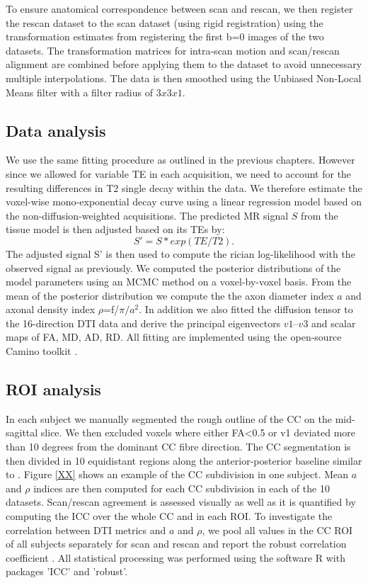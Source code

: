 To ensure anatomical correspondence between scan and rescan, we then register the rescan dataset to the scan dataset (using rigid registration) using the transformation estimates from registering  the first b=0 images of the two datasets. The transformation matrices for intra-scan motion and scan/rescan alignment are combined before applying them to the dataset to avoid unnecessary multiple interpolations. The data is then smoothed using the Unbiased Non-Local Means filter \citep{Aja-Fernandez:2010} with a filter radius of $3x3x1$.

\subsection*{Data analysis}
We use the same fitting procedure as outlined in the previous chapters. However since we allowed for variable TE in each acquisition, we need to account for the resulting differences in T2 single decay within the data. We therefore estimate the voxel-wise mono-exponential decay curve using a linear regression model based on the non-diffusion-weighted acquisitions. The predicted MR signal $S$ from the tissue model is then adjusted based on its \glspl{TE} by:
\begin{equation}
	S' = S * exp(TE/T2).
\end{equation}
The adjusted signal S' is then used to compute the rician log-likelihood with the observed signal as previously. We computed the posterior distributions of the model parameters using an MCMC method on a voxel-by-voxel basis. From the mean of the posterior distribution we compute the the axon diameter index $a$ and axonal density index $\rho$=f/$\pi/a^2$. In addition we also fitted the diffusion tensor to the 16-direction DTI data and derive the principal eigenvectors $v1$--$v3$ and scalar maps of FA, MD, AD, RD. All fitting are implemented using the open-source Camino toolkit \citep{Cook:2009}.
\subsection*{ROI analysis} In each subject we manually segmented the rough outline of the CC on the mid-sagittal slice. We then excluded voxels where either FA<0.5 or v1 deviated more than 10 degrees from the dominant CC fibre direction. The CC segmentation is then divided in 10 equidistant regions along the anterior-posterior baseline similar to \cite{Aboitiz}. Figure \ref{XX} shows an example of the CC subdivision in one subject. Mean $a$ and $\rho$ indices are then computed for each CC subdivision in each of the 10 datasets. Scan/rescan agreement is assessed visually as well as it is quantified by computing the \gls{ICC} \citep{Shrout:1979} over the whole CC and in each \gls{ROI}. To investigate the correlation between DTI metrics and $a$ and $\rho$, we pool all values in the CC ROI of all subjects separately for scan and rescan and report the robust correlation coefficient \citep{XX}. All statistical processing was performed using the software R\citep{RCoreTeam:2012} with packages 'ICC'\citep{Wolak:2011} and 'robust'\citep{Wang:2012}.
\FloatBarrier
